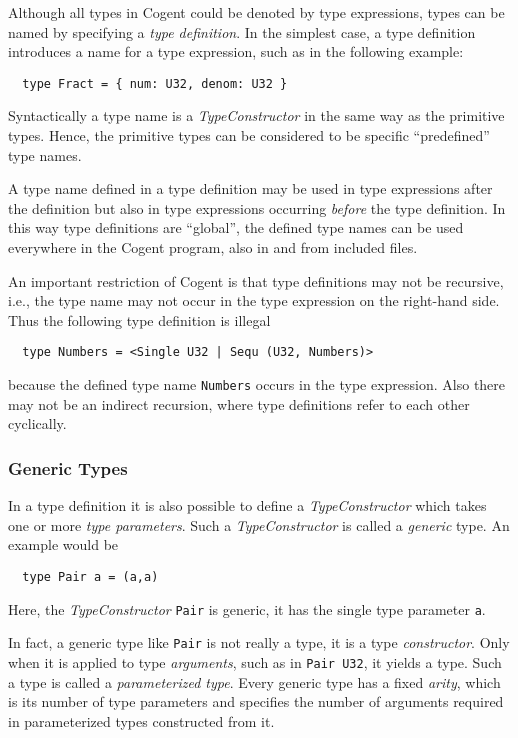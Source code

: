 \documentclass[a4paper]{report}
\newcommand{\code}[1]{\textnormal{\texttt{#1}}}
\newcommand{\cogent}{Cogent\xspace}
\begin{document}
Although all types in \cogent could be denoted by type expressions, types can be named by specifying a 
\textit{type definition}. In the simplest case, a type definition introduces a name for a type expression,
such as in the following example:

\begin{verbatim}
  type Fract = { num: U32, denom: U32 }
\end{verbatim}

Syntactically a type name is a \textit{TypeConstructor} in the same way as the primitive types. Hence, the 
primitive types can be considered to be specific ``predefined'' type names.

A type name defined in a type definition may be used in type expressions after the definition but also in type
expressions occurring \textit{before} the type definition. In this way type definitions are ``global'', the 
defined type names can be used everywhere in the \cogent program,  also in and from included files.

An important restriction of \cogent is that type definitions may not be recursive, i.e., the type name may
not occur in the type expression on the right-hand side. Thus the following type definition is illegal
\begin{verbatim}
  type Numbers = <Single U32 | Sequ (U32, Numbers)>
\end{verbatim}
because the defined type name \code{Numbers} occurs in the type expression. Also there may not be an indirect
recursion, where type definitions refer to each other cyclically.

\subsubsection{Generic Types}

In a type definition it is also possible to define a \textit{TypeConstructor} which takes one or more
\textit{type parameters}. Such a \textit{TypeConstructor} is called a \textit{generic} type. 
An example would be

\begin{verbatim}
  type Pair a = (a,a)
\end{verbatim}

Here, the \textit{TypeConstructor} \code{Pair} is generic, it has the single type parameter \code{a}.

In fact, a generic type like \code{Pair} is not really a type, it is a type \textit{constructor}. Only when it
is applied to type \textit{arguments}, such as in \texttt{Pair U32}, it yields a type. Such a type is called
a \textit{parameterized type}. Every generic type has a fixed \textit{arity}, which is its number of type
parameters and specifies the number of arguments required in parameterized types constructed from it.
\end{document}
